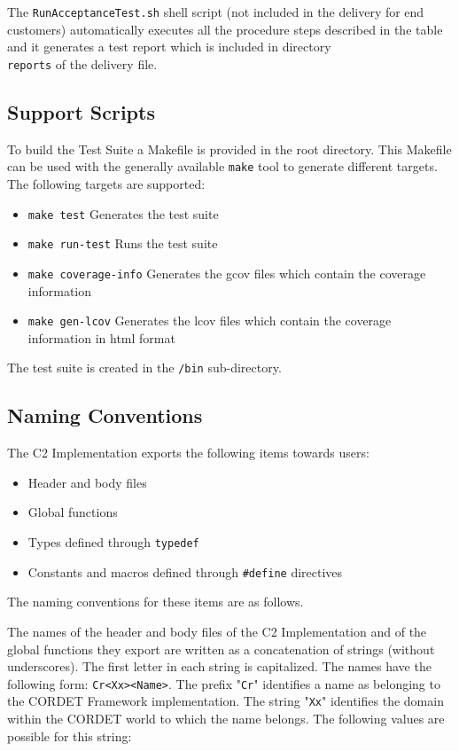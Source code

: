 \documentclass{pnp_article}
\begin{document}
The \texttt{RunAcceptanceTest.sh} shell script (not included in the delivery for end customers) automatically executes all the procedure steps described in the table and it generates a test report which is included in directory \texttt{\\reports} of the delivery file.

\subsection{Support Scripts}\label{sec:script}
To build the Test Suite a Makefile is provided in the root directory. This Makefile can be used with the generally available \texttt{make} tool to generate different targets. The following targets are supported:

\begin{itemize}
\item \texttt{make test} Generates the test suite
\item \texttt{make run-test} Runs the test suite
\item \texttt{make coverage-info} Generates the gcov files which contain the coverage information
\item \texttt{make gen-lcov} Generates the lcov files which contain the coverage information in html format
\end{itemize}

The test suite is created in the \texttt{/bin} sub-directory.


\subsection{Naming Conventions}
The C2 Implementation exports the following items towards users:

\begin{itemize}
\item Header and body files
\item Global functions
\item Types defined through \texttt{typedef} 
\item Constants and macros defined through \texttt{\#define} directives
\end{itemize}

The naming conventions for these items are as follows.
 
The names of the header and body files of the C2 Implementation and of the global 
functions they export are written as a concatenation of strings (without underscores). 
The first letter in each string is capitalized. The names have the following form: 
\texttt{Cr<Xx><Name>}. The prefix "\texttt{Cr}" identifies a name as belonging to the CORDET Framework implementation. 
The string "\texttt{Xx}" identifies the domain within the CORDET world 
to which the name belongs. The following values are possible for this string: 
\end{document}

